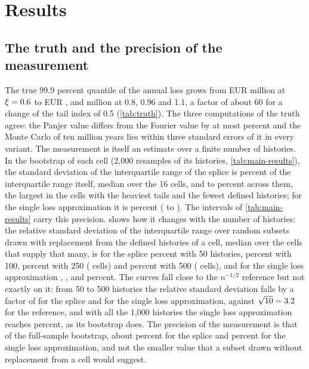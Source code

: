 \section{Results}
\label{sec:results}

\subsection{The truth and the precision of the measurement}
\label{sec:res-truth}

The true 99.9 percent quantile of the annual loss grows from EUR \truthA{} million at $\xi=0.6{}$ to EUR \truthB{}, \truthC{} and \truthD{} million at 0.8, 0.96 and 1.1, a factor of about 60 for a change of the tail index of 0.5 (\cref{tab:truth}). The three computations of the truth agree: the Panjer value differs from the Fourier value by at most \panGapD{} percent and the Monte Carlo of ten million years lies within three standard errors of it in every variant.
The measurement is itself an estimate over a finite number of histories. In the bootstrap of each cell (2{,}000 resamples of its histories, \cref{tab:main-results}), the standard deviation of the interquartile range of the splice is \bootSpMed{} percent of the interquartile range itself, median over the 16 cells, and \bootSpMin{} to \bootSpMax{} percent across them, the largest in the cells with the heaviest tails and the fewest defined histories; for the single loss approximation it is \bootSlMed{} percent (\bootSlMin{} to \bootSlMax{}). The intervals of \cref{tab:main-results} carry this precision.
 shows how it changes with the number of histories: the relative standard deviation of the interquartile range over random subsets drawn with replacement from the defined histories of a cell, median over the cells that supply that many, is for the splice \subSpFifty{} percent with 50 histories, \subSpHundred{} percent with 100, \subSpTwoFifty{} percent with 250 (\subSpTwoFiftyCells{} cells) and \subSpFiveHundred{} percent with 500 (\subSpFiveHundredCells{} cells), and for the single loss approximation \subSlFifty{}, \subSlHundred{}, \subSlTwoFifty{} and \subSlFiveHundred{} percent.
The curves fall close to the $n^{-1/2}$ reference but not exactly on it: from 50 to 500 histories the relative standard deviation falls by a factor of \dropSp{} for the splice and \dropSl{} for the single loss approximation, against $\sqrt{10}=3.2{}$ for the reference, and with all the 1{,}000 histories the single loss approximation reaches \subSlThousand{} percent, as its bootstrap does. The precision of the measurement is that of the full-sample bootstrap, about \bootSpMed{} percent for the splice and \bootSlMed{} percent for the single loss approximation, and not the smaller value that a subset drawn without replacement from a cell would suggest.

